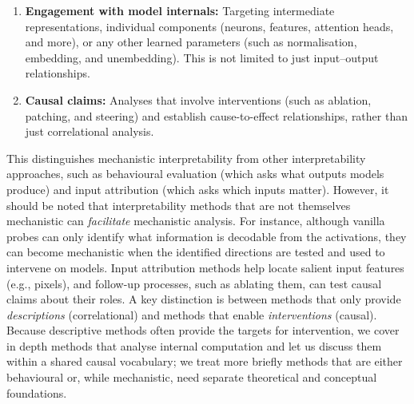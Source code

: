 \begin{enumerate}
    \item \textbf{Engagement with model internals:} Targeting intermediate representations, individual components (neurons, features, attention heads, and more), or any other learned parameters (such as normalisation, embedding, and unembedding). This is not limited to just input--output relationships.
    \item \textbf{Causal claims:} Analyses that involve interventions (such as ablation, patching, and steering) and establish cause-to-effect relationships, rather than just correlational analysis.
\end{enumerate}

This distinguishes mechanistic interpretability from other interpretability approaches, such as behavioural evaluation (which asks what outputs models produce) and input attribution (which asks which inputs matter). However, it should be noted that interpretability methods that are not themselves mechanistic can \textit{facilitate} mechanistic analysis. For instance, although vanilla probes can only identify what information is decodable from the activations, they can become mechanistic when the identified directions are tested and used to intervene on models. Input attribution methods help locate salient input features (e.g., pixels), and follow-up processes, such as ablating them, can test causal claims about their roles. A key distinction is between methods that only provide \textit{descriptions} (correlational) and methods that enable \textit{interventions} (causal). Because descriptive methods often provide the targets for intervention, we cover in depth methods that analyse internal computation and let us discuss them within a shared causal vocabulary; we treat more briefly methods that are either behavioural or, while mechanistic, need separate theoretical and conceptual foundations.

